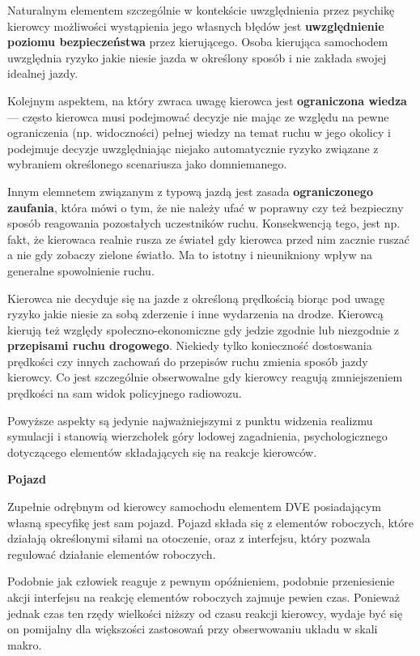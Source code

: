 {{{\begin{itemize}
\end{itemize}
}
\par{
Naturalnym elementem szczególnie w kontekście uwzględnienia przez psychikę kierowcy możliwości wystąpienia jego własnych błędów jest \textbf{uwzględnienie poziomu bezpieczeństwa} przez kierującego. Osoba kierująca samochodem uwzględnia ryzyko jakie niesie jazda w określony sposób i nie zakłada swojej idealnej jazdy.
}
\par{
Kolejnym aspektem, na który zwraca uwagę kierowca jest \textbf{ograniczona wiedza} --- często kierowca musi podejmować decyzje nie mając ze względu na pewne ograniczenia (np. widoczności) pełnej wiedzy na temat ruchu w jego okolicy i podejmuje decyzje uwzględniając niejako automatycznie ryzyko związane z wybraniem określonego scenariusza jako domniemanego.
}
\par{
Innym elemnetem związanym z typową jazdą jest zasada \textbf{ograniczonego zaufania}, która mówi o tym, że nie należy ufać w poprawny czy też bezpieczny sposób reagowania pozostałych uczestników ruchu. Konsekwencją tego, jest np. fakt, że kierowaca realnie rusza ze świateł gdy kierowca przed nim zacznie ruszać a nie gdy zobaczy zielone światło. Ma to istotny i nieunikniony wpływ na generalne spowolnienie ruchu.
}
\par{
Kierowca nie decyduje się na jazde z określoną prędkością biorąc pod uwagę ryzyko jakie niesie za sobą zderzenie i inne wydarzenia na drodze. Kierowcą kierują też względy społeczno-ekonomiczne gdy jedzie zgodnie lub niezgodnie z \textbf{przepisami ruchu drogowego}. Niekiedy tylko konieczność dostoswania prędkości czy innych zachowań do przepisów ruchu zmienia sposób jazdy kierowcy. Co jest szczególnie obserwowalne gdy kierowcy reagują zmniejszeniem prędkości na sam widok policyjnego radiowozu.
}
\par{
Powyższe aspekty są jedynie najważniejszymi z punktu widzenia realizmu symulacji i stanowią wierzchołek góry lodowej zagadnienia, psychologicznego dotyczącego elementów składających się na reakcje kierowców.
}
\par{ }
\par{
\textbf{Pojazd}
}
\par{
Zupełnie odrębnym od kierowcy samochodu elementem DVE posiadającym własną specyfikę jest sam pojazd. Pojazd składa się z elementów roboczych, które działają określonymi siłami na otoczenie, oraz z interfejsu, który pozwala regulować działanie elementów roboczych.
}
\par{
Podobnie jak człowiek reaguje z pewnym opóźnieniem, podobnie przeniesienie akcji interfejsu na reakcję elementów roboczych zajmuje pewien czas. Ponieważ jednak czas ten rzędy wielkości niższy od czasu reakcji kierowcy, wydaje być się on pomijalny dla większości zastosowań przy obserwowaniu układu w skali makro.
}}}
